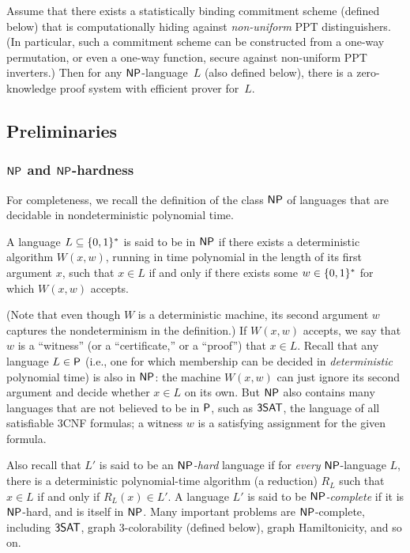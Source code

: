 \documentclass[11pt]{article}
\begin{document}
\begin{theorem}
  \label{thm:zkp-np}
  Assume that there exists a statistically binding commitment scheme (defined below) that is computationally hiding against \emph{non-uniform} PPT distinguishers.
  (In particular, such a commitment scheme can be constructed from a one-way permutation, or even a one-way function, secure against non-uniform PPT inverters.)
  Then for any $\NP$-language~$L$ (also defined below), there is a zero-knowledge proof system with efficient prover for~$L$.
\end{theorem}

\subsection{Preliminaries}
\label{sec:preliminaries}

\subsubsection{$\NP$ and $\NP$-hardness}
\label{sec:np}

For completeness, we recall the definition of the class $\NP$ of
languages that are decidable in nondeterministic polynomial time.

\begin{definition}
  \label{def:np}
  A language $L \subseteq \bit^{*}$ is said to be in $\NP$ if there
  exists a deterministic algorithm $W(x,w)$, running in time
  polynomial in the length of its first argument $x$, such that $x \in
  L$ if and only if there exists some $w \in \bit^{*}$ for which
  $W(x,w)$ accepts.
\end{definition}

(Note that even though $W$ is a deterministic machine, its second
argument $w$ captures the nondeterminism in the definition.)  If
$W(x,w)$ accepts, we say that $w$ is a ``witness'' (or a
``certificate,'' or a ``proof'') that $x \in L$.  Recall that any
language $L \in \P$ (i.e., one for which membership can be decided in
\emph{deterministic} polynomial time) is also in $\NP$: the machine
$W(x,w)$ can just ignore its second argument and decide whether $x \in
L$ on its own.  But $\NP$ also contains many languages that are not
believed to be in $\P$, such as $\problem{3SAT}$, the language of all
satisfiable 3CNF formulas; a witness $w$ is a satisfying assignment
for the given formula.

Also recall that $L'$ is said to be an \emph{$\NP$-hard} language if
for \emph{every} $\NP$-language $L$, there is a deterministic
polynomial-time algorithm (a reduction) $R_{L}$ such that $x \in L$ if
and only if $R_{L}(x) \in L'$.  A language $L'$ is said to be
\emph{$\NP$-complete} if it is $\NP$-hard, and is itself in $\NP$.
Many important problems are $\NP$-complete, including
$\problem{3SAT}$, graph $3$-colorability (defined below), graph
Hamiltonicity, and so on.
\end{document}
